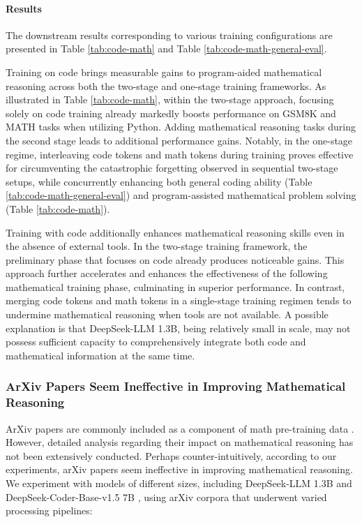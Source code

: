 \paragraph{Results}
The downstream results corresponding to various training configurations are presented in Table \ref{tab:code-math} and Table \ref{tab:code-math-general-eval}.

Training on code brings measurable gains to program-aided mathematical reasoning across both the two-stage and one-stage training frameworks. As illustrated in Table \ref{tab:code-math}, within the two-stage approach, focusing solely on code training already markedly boosts performance on GSM8K and MATH tasks when utilizing Python. Adding mathematical reasoning tasks during the second stage leads to additional performance gains. Notably, in the one-stage regime, interleaving code tokens and math tokens during training proves effective for circumventing the catastrophic forgetting observed in sequential two-stage setups, while concurrently enhancing both general coding ability (Table \ref{tab:code-math-general-eval}) and program-assisted mathematical problem solving (Table \ref{tab:code-math}).

Training with code additionally enhances mathematical reasoning skills even in the absence of external tools. In the two-stage training framework, the preliminary phase that focuses on code already produces noticeable gains. This approach further accelerates and enhances the effectiveness of the following mathematical training phase, culminating in superior performance. In contrast, merging code tokens and math tokens in a single-stage training regimen tends to undermine mathematical reasoning when tools are not available. A possible explanation is that DeepSeek-LLM 1.3B, being relatively small in scale, may not possess sufficient capacity to comprehensively integrate both code and mathematical information at the same time.

\subsubsection{ArXiv Papers Seem Ineffective in Improving Mathematical Reasoning}

ArXiv papers are commonly included as a component of math pre-training data \citep{minerva,gpt-f,llemma,mathpile}. However, detailed analysis regarding their impact on mathematical reasoning has not been extensively conducted. Perhaps counter-intuitively, according to our experiments, arXiv papers seem ineffective in improving mathematical reasoning. We experiment with models of different sizes, including DeepSeek-LLM 1.3B and DeepSeek-Coder-Base-v1.5 7B \citep{deepseek-coder}, using arXiv corpora that underwent varied processing pipelines:

